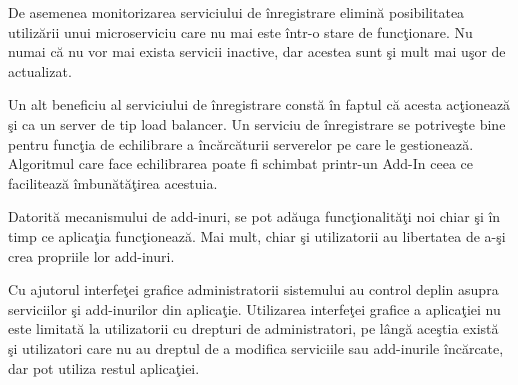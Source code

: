 \documentclass[a4paper,12pt]{report}
\begin{document}
De asemenea monitorizarea serviciului de \^inregistrare elimin\u a posibilitatea 
utiliz\u arii unui microserviciu care nu mai este \^intr-o stare de func\c tionare.
Nu numai c\u a nu vor mai exista servicii inactive, dar acestea sunt  \c si mult mai 
u\c sor de actualizat. 

Un alt beneficiu al serviciului de \^inregistrare const\u a \^in faptul c\u a acesta
ac\c tioneaz\u a \c si ca un server de tip load balancer.
Un serviciu de \^inregistrare se potrive\c ste bine pentru func\c tia de echilibrare a \^inc\u arc\u aturii
serverelor pe care le gestioneaz\u a. Algoritmul care face echilibrarea poate fi 
schimbat printr-un Add-In ceea ce faciliteaz\u a \^imbun\u at\u a\c tirea acestuia.

Datorit\u a mecanismului de add-inuri, se pot ad\u auga func\c tionalit\u a\c ti noi
chiar \c si \^in timp ce aplica\c tia func\c tioneaz\u a. Mai mult,
chiar \c si utilizatorii au libertatea de a-\c si crea propriile lor add-inuri. 

Cu ajutorul interfe\c tei grafice administratorii sistemului au control deplin 
asupra serviciilor \c si add-inurilor din aplica\c tie. Utilizarea interfe\c tei grafice 
a aplica\c tiei nu este limitat\u a la utilizatorii cu drepturi de administratori, 
pe l\^ang\u a ace\c stia exist\u a \c si utilizatori care nu au dreptul de a modifica serviciile 
sau add-inurile \^inc\u arcate, dar pot utiliza restul aplica\c tiei.

\nocite{BrokerMsdn}
\printbibliography
\end{document}
